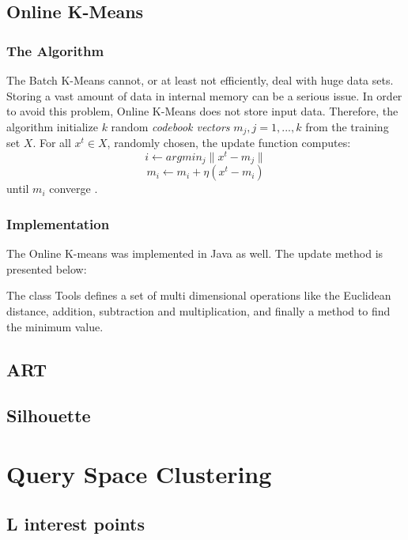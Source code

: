 \documentclass{lmproj}
\begin{document}
\subsection{Online K-Means}
\subsubsection{The Algorithm}
The Batch K-Means cannot, or at least not efficiently, deal with huge data sets. Storing a vast amount of data in internal memory can be a serious issue. In order to avoid this problem, Online K-Means does not store input data. Therefore, the algorithm initialize $k$ random \textit{codebook vectors} $m_j,j=1,...,k$ from the training set $X$. For all $x^t \in X$, randomly chosen, the update function computes:  
\begin{equation}
i \longleftarrow arg min_j \parallel x^t - m_j \parallel
\end{equation}
\begin{equation}
m_i \longleftarrow m_i + \eta (x^t - m_i)
\end{equation}
until $m_i$ converge \cite{Clustering}.

\subsubsection{Implementation}
The Online K-means was implemented in Java as well. The update method is presented below:

The class Tools defines a set of multi dimensional operations like the Euclidean distance, addition, subtraction and multiplication, and finally a method to find the minimum value. 


\subsection{ART}
\subsection{Silhouette}

\section{Query Space Clustering}
\subsection{L interest points}
\end{document}

